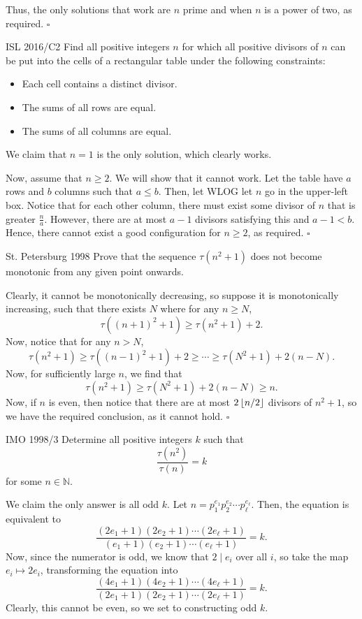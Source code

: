 \documentclass{article}
\begin{document}
Thus, the only solutions that work are $n$ prime and when $n$ is a power of two, as required. $\square$

\begin{problem}[3.7.12]{ISL 2016/C2}
Find all positive integers $n$ for which all positive divisors of $n$ can be put into the cells of a rectangular table under the following constraints:
\begin{itemize}
\item Each cell contains a distinct divisor.
\item The sums of all rows are equal.
\item The sums of all columns are equal.
\end{itemize}
\end{problem}

We claim that $n = \boxed{1}$ is the only solution, which clearly works.

Now, assume that $n \ge 2$. We will show that it cannot work. Let the table have $a$ rows and $b$ columns such that $a \le b$. Then, let WLOG let $n$ go in the upper-left box. Notice that for each other column, there must exist some divisor of $n$ that is greater $\tfrac{n}{a}$. However, there are at most $a-1$ divisors satisfying this and $a-1 < b$. Hence, there cannot exist a good configuration for $n \ge 2$, as required. $\square$

\begin{problem}[3.7.13]{St. Petersburg 1998}
Prove that the sequence $\tau(n^2+1)$ does not become monotonic from any given point onwards.
\end{problem}

Clearly, it cannot be monotonically decreasing, so suppose it is monotonically increasing, such that there exists $N$ where for any $n \ge N$, \[\tau((n+1)^2+1) \ge \tau(n^2+1)+2.\] Now, notice that for any $n > N$, \[\tau(n^2+1) \ge \tau((n-1)^2+1)+2 \ge \cdots \ge \tau(N^2+1)+2(n-N).\] Now, for sufficiently large $n$, we find that \[\tau(n^2+1) \ge \tau(N^2+1)+2(n-N) \ge n.\] Now, if $n$ is even, then notice that there are at most $2 \left\lfloor n/2 \right\rfloor$ divisors of $n^2+1$, so we have the required conclusion, as it cannot hold. $\square$

\begin{problem}[3.7.14]{IMO 1998/3}
Determine all positive integers $k$ such that \[\dfrac{\tau(n^2)}{\tau(n)} = k\] for some $n \in \mathbb{N}$.
\end{problem}

We claim the only answer is all odd $k$. Let $n = p_1^{e_1}p_2^{e_2}\cdots p_{\ell}^{e_{\ell}}$. Then, the equation is equivalent to \[\dfrac{(2e_1+1)(2e_2+1)\cdots(2e_{\ell}+1)}{(e_1+1)(e_2+1)\cdots(e_{\ell}+1)} = k.\] Now, since the numerator is odd, we know that $2 \mid e_i$ over all $i$, so take the map $e_i \mapsto 2e_i$, transforming the equation into \[\dfrac{(4e_1+1)(4e_2+1)\cdots(4e_{\ell}+1)}{(2e_1+1)(2e_2+1)\cdots(2e_{\ell}+1)} = k.\] Clearly, this cannot be even, so we set to constructing odd $k$.
\end{document}
